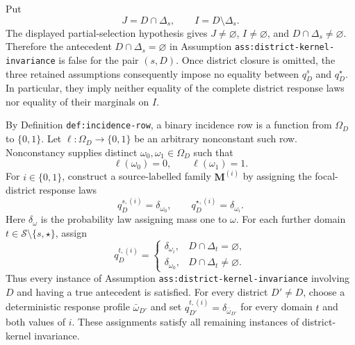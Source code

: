 Put
\[
J=D\cap\Delta_s,
\qquad
I=D\setminus\Delta_s.
\]
The displayed partial-selection hypothesis gives \(J\ne\varnothing\), \(I\ne\varnothing\), and \(D\cap\Delta_s\ne\varnothing\).  Therefore the antecedent \(D\cap\Delta_s=\varnothing\) in Assumption \texttt{ass:district-kernel-invariance} is false for the pair \((s,D)\).  Once district closure is omitted, the three retained assumptions consequently impose no equality between \(q_D^s\) and \(q_D^\star\).  In particular, they imply neither equality of the complete district response laws nor equality of their marginals on \(I\).

By Definition \texttt{def:incidence-row}, a binary incidence row is a function from \(\Omega_D\) to \(\{0,1\}\).  Let \(\ell:\Omega_D\to\{0,1\}\) be an arbitrary nonconstant such row.  Nonconstancy supplies distinct \(\omega_0,\omega_1\in\Omega_D\) such that
\[
\ell(\omega_0)=0,
\qquad
\ell(\omega_1)=1.
\tag{1}
\]
For \(i\in\{0,1\}\), construct a source-labelled family \(\mathbf M^{(i)}\) by assigning the focal-district response laws
\[
q_D^{s,(i)}=\delta_{\omega_0},
\qquad
q_D^{\star,(i)}=\delta_{\omega_i}.
\tag{2}
\]
Here \(\delta_\omega\) is the probability law assigning mass one to \(\omega\).  For each further domain \(t\in\mathcal S\setminus\{s,\star\}\), assign
\[
q_D^{t,(i)}=
\begin{cases}
\delta_{\omega_i},&D\cap\Delta_t=\varnothing,\\
\delta_{\omega_0},&D\cap\Delta_t\ne\varnothing.
\end{cases}
\tag{3}
\]
Thus every instance of Assumption \texttt{ass:district-kernel-invariance} involving \(D\) and having a true antecedent is satisfied.  For every district \(D'\ne D\), choose a deterministic response profile \(\bar\omega_{D'}\) and set \(q_{D'}^{t,(i)}=\delta_{\bar\omega_{D'}}\) for every domain \(t\) and both values of \(i\).  These assignments satisfy all remaining instances of district-kernel invariance.

